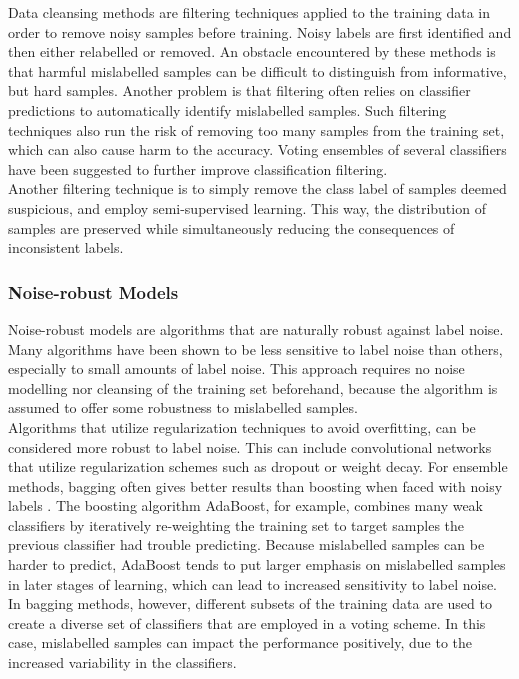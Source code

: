 Data cleansing methods are filtering techniques applied to the training data in order to remove noisy samples before training. Noisy labels are first identified and then either relabelled or removed. An obstacle encountered by these methods is that harmful mislabelled samples can be difficult to distinguish from informative, but hard samples. Another problem is that filtering often relies on classifier predictions to automatically identify mislabelled samples. Such filtering techniques also run the risk of removing too many samples from the training set, which can also cause harm to the accuracy. Voting ensembles of several classifiers have been suggested to further improve classification filtering.\\ 

Another filtering technique is to simply remove the class label of samples deemed suspicious, and employ semi-supervised learning. This way, the distribution of samples are preserved while simultaneously reducing the consequences of inconsistent labels.\\


\subsubsection{Noise-robust Models}
Noise-robust models are algorithms that are naturally robust against label noise. Many algorithms have been shown to be less sensitive to label noise than others, especially to small amounts of label noise. This approach requires no noise modelling nor cleansing of the training set beforehand, because the algorithm is assumed to offer some robustness to mislabelled samples.\\

 Algorithms that utilize regularization techniques to avoid overfitting, can be considered more robust to label noise. This can include convolutional networks that utilize regularization schemes such as dropout or weight decay. For ensemble methods, bagging often gives better results than boosting when faced with noisy labels \citep{Dietterich_boosting_bagging}. The boosting algorithm AdaBoost, for example, combines many weak classifiers by iteratively re-weighting the training set to target samples the previous classifier had trouble predicting. Because mislabelled samples can be harder to predict, AdaBoost tends to put larger emphasis on mislabelled samples in later stages of learning, which can lead to increased sensitivity to label noise. In bagging methods, however, different subsets of the training data are used to create a diverse set of classifiers that are employed in a voting scheme. In this case, mislabelled samples can impact the performance positively, due to the increased variability in the classifiers.   


